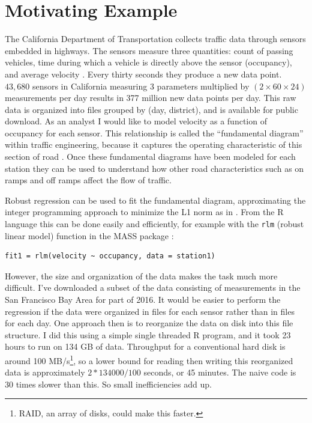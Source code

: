 \documentclass[12pt]{article}
\begin{document}
\section{Motivating Example}
\label{sec:pems}

The California Department of Transportation collects traffic data through
sensors embedded in highways. The sensors measure three quantities: count
of passing vehicles, time during which a vehicle is directly above the
sensor (occupancy), and average velocity \cite{jia2001pems}.  Every thirty
seconds they produce a new data point. $43,680$ sensors in California
measuring 3 parameters multiplied by $(2 \times 60 \times 24)$ measurements
per day results in 377 million new data points per day.  This raw data is
organized into files grouped by (day, district), and is available for
public download.  As an analyst I would like to model velocity as a
function of occupancy for each sensor. This relationship is called the
``fundamental diagram'' within traffic engineering, because it captures the
operating characteristic of this section of road
\cite{daganzo1997fundamentals}. Once these fundamental diagrams have been
modeled for each station they can be used to understand how other road
characteristics such as on ramps and off ramps affect the flow of traffic.

Robust regression can be used to fit the fundamental diagram, approximating
the integer programming approach to minimize the L1 norm as in
\cite{li2011fundamental}.  From the R language this can be done easily and
efficiently, for example with the \texttt{rlm} (robust linear model)
function in the MASS package \cite{venables2013modern}:

\begin{verbatim}
fit1 = rlm(velocity ~ occupancy, data = station1)
\end{verbatim}

However, the size and organization of the data makes the task much more
difficult.  I've downloaded a subset of the data consisting of measurements
in the San Francisco Bay Area for part of 2016.  It would be easier to
perform the regression if the data were organized in files for each sensor
rather than in files for each day.  One approach then is to reorganize the
data on disk into this file structure. I did this using a simple single
threaded R program, and it took 23 hours to run on 134 GB of data.
Throughput for a conventional hard disk is around 100 MB/s\footnote{RAID,
an array of disks, could make this faster.}, so a lower bound for reading
then writing this reorganized data is approximately $2 * 134000 / 100$
seconds, or 45 minutes. The naive code is 30 times slower than this. So
small inefficiencies add up.
\end{document}

